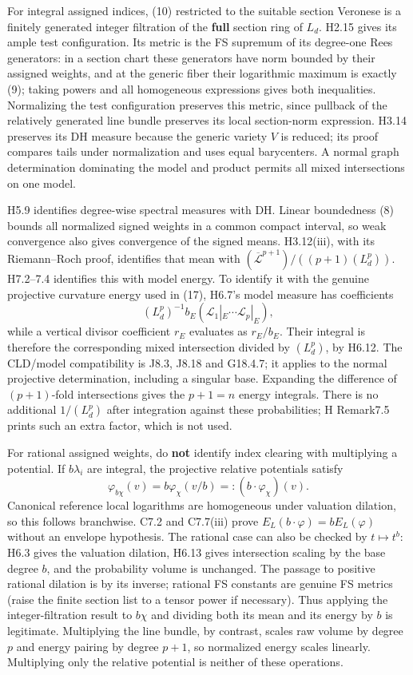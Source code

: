\documentclass[
  11pt,
]{article}
\begin{document}
For integral assigned indices, (10) restricted to the suitable section
Veronese is a finitely generated integer filtration of the \textbf{full}
section ring of \(L_d\). H2.15 gives its ample test configuration. Its
metric is the FS supremum of its degree-one Rees generators: in a
section chart these generators have norm bounded by their assigned
weights, and at the generic fiber their logarithmic maximum is exactly
(9); taking powers and all homogeneous expressions gives both
inequalities. Normalizing the test configuration preserves this metric,
since pullback of the relatively generated line bundle preserves its
local section-norm expression. H3.14 preserves its DH measure because
the generic variety \(V\) is reduced; its proof compares tails under
normalization and uses equal barycenters. A normal graph determination
dominating the model and product permits all mixed intersections on one
model.

H5.9 identifies degree-wise spectral measures with DH. Linear
boundedness (8) bounds all normalized signed weights in a common compact
interval, so weak convergence also gives convergence of the signed
means. H3.12(iii), with its Riemann--Roch proof, identifies that mean
with \((\overline{\mathcal L}^{p+1})/((p+1)(L_d^p))\). H7.2--7.4
identifies this with model energy. To identify it with the genuine
projective curvature energy used in (17), H6.7's model measure has
coefficients
\[ (L_d^p)^{-1} b_E(\mathcal L_1|_E\cdots\mathcal L_p|_E),\] while a
vertical divisor coefficient \(r_E\) evaluates as \(r_E/b_E\). Their
integral is therefore the corresponding mixed intersection divided by
\((L_d^p)\), by H6.12. The CLD/model compatibility is J8.3, J8.18 and
G18.4.7; it applies to the normal projective determination, including a
singular base. Expanding the difference of \((p+1)\)-fold intersections
gives the \(p+1=n\) energy integrals. There is no additional
\(1/(L_d^p)\) after integration against these probabilities; H Remark7.5
prints such an extra factor, which is not used.

For rational assigned weights, do \textbf{not} identify index clearing
with multiplying a potential. If \(b\lambda_i\) are integral, the
projective relative potentials satisfy
\[ \varphi_{b\chi}(v)=b\varphi_\chi(v/b)=:(b\mathbin\cdot\varphi_\chi)(v).  \tag{20}\]
Canonical reference local logarithms are homogeneous under valuation
dilation, so this follows branchwise. C7.2 and C7.7(iii) prove
\(E_L(b\cdot\varphi)=bE_L(\varphi)\) without an envelope hypothesis. The
rational case can also be checked by \(t\mapsto t^b\): H6.3 gives the
valuation dilation, H6.13 gives intersection scaling by the base degree
\(b\), and the probability volume is unchanged. The passage to positive
rational dilation is by its inverse; rational FS constants are genuine
FS metrics (raise the finite section list to a tensor power if
necessary). Thus applying the integer-filtration result to \(b\chi\) and
dividing both its mean and its energy by \(b\) is legitimate.
Multiplying the line bundle, by contrast, scales raw volume by degree
\(p\) and energy pairing by degree \(p+1\), so normalized energy scales
linearly. Multiplying only the relative potential is neither of these
operations.
\end{document}
